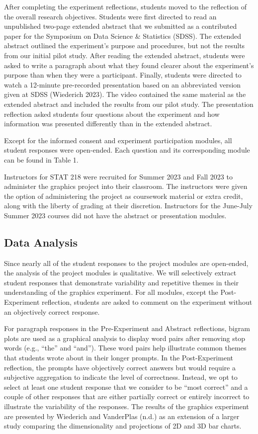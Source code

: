 \documentclass[
  12pt,
]{article}
\begin{document}
After completing the experiment reflections, students moved to the
reflection of the overall research objectives. Students were first
directed to read an unpublished two-page extended abstract that we
submitted as a contributed paper for the Symposium on Data Science \&
Statistics (SDSS). The extended abstract outlined the experiment's
purpose and procedures, but not the results from our initial pilot
study. After reading the extended abstract, students were asked to write
a paragraph about what they found clearer about the experiment's purpose
than when they were a participant. Finally, students were directed to
watch a 12-minute pre-recorded presentation based on an abbreviated
version given at SDSS (Wiederich 2023). The video contained the same
material as the extended abstract and included the results from our
pilot study. The presentation reflection asked students four questions
about the experiment and how information was presented differently than
in the extended abstract.

Except for the informed consent and experiment participation modules,
all student responses were open-ended. Each question and its
corresponding module can be found in Table 1.

Instructors for STAT 218 were recruited for Summer 2023 and Fall 2023 to
administer the graphics project into their classroom. The instructors
were given the option of administering the project as coursework
material or extra credit, along with the liberty of grading at their
discretion. Instructors for the June-July Summer 2023 courses did not
have the abstract or presentation modules.

\subsection{Data Analysis}\label{data-analysis}

Since nearly all of the student responses to the project modules are
open-ended, the analysis of the project modules is qualitative. We will
selectively extract student responses that demonstrate variability and
repetitive themes in their understanding of the graphics experiment. For
all modules, except the Post-Experiment reflection, students are asked
to comment on the experiment without an objectively correct response.

For paragraph responses in the Pre-Experiment and Abstract reflections,
bigram plots are used as a graphical analysis to display word pairs
after removing stop words (e.g., ``the'' and ``and''). These word pairs
help illustrate common themes that students wrote about in their longer
prompts. In the Post-Experiment reflection, the prompts have objectively
correct answers but would require a subjective aggregation to indicate
the level of correctness. Instead, we opt to select at least one student
response that we consider to be ``most correct'' and a couple of other
responses that are either partially correct or entirely incorrect to
illustrate the variability of the responses. The results of the graphics
experiment are presented by Wiederich and VanderPlas (n.d.) as an
extension of a larger study comparing the dimensionality and projections
of 2D and 3D bar charts.
\end{document}
